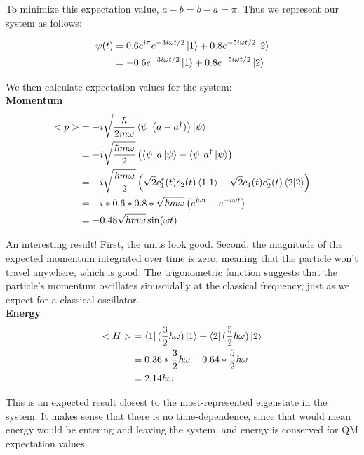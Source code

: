 \documentclass[10pt]{article} %
\begin{document}
To minimize this expectation value, $a-b = b-a = \pi$. Thus we represent our system as follows:

\begin{align*}
  \psi(t) &= 0.6e^{i\pi}e^{-3i\omega t/2}\ket{1} + 0.8e^{-5i\omega t/2}\ket{2}\\
  &= -0.6e^{-3i\omega t/2}\ket{1} + 0.8e^{-5i\omega t/2}\ket{2}\\
\end{align*}

We then calculate expectation values for the system:\\

\textbf{Momentum}
\begin{align*}
  <p> &= -i\sqrt{\frac{\hbar}{2m\omega}}\bra{\psi}\left(a - a^\dagger)\right)\ket{\psi}\\
  &= -i\sqrt{\frac{\hbar m\omega}{2}}\left(\bra{\psi}a\ket{\psi}
  - \bra{\psi}a^\dagger\ket{\psi}\right)\\
  &= -i\sqrt{\frac{\hbar m\omega}{2}}\left(\sqrt{2}c_1^*(t)c_2(t)\bra{1}\ket{1}
  - \sqrt{2}c_1(t)c_2^*(t)\bra{2}\ket{2}\right)\\
  &= -i*0.6*0.8*\sqrt{\hbar m\omega}\left(e^{i\omega t} - e^{-i\omega t}\right)\\
  &= -0.48\sqrt{\hbar m\omega}\sin(\omega t)\\
\end{align*}

An interesting result! First, the units look good. Second, the magnitude of the expected momentum
integrated over time is zero, meaning that the particle won't travel anywhere, which is good. The
trigonometric function suggests that the particle's momentum oscillates sinusoidally at the
classical frequency, just as we expect for a classical oscillator.\\

\textbf{Energy}
\begin{align*}
  <H> &= \bra{1}(\frac{3}{2}\hbar\omega)\ket{1} + \bra{2}(\frac{5}{2}\hbar\omega)\ket{2}\\
  &= 0.36 * \frac{3}{2}\hbar\omega + 0.64 * \frac{5}{2}\hbar\omega\\
  &= 2.14\hbar\omega\\
\end{align*}

This is an expected result closest to the most-represented eigenstate in the system. It makes sense
that there is no time-dependence, since that would mean energy would be entering and leaving the
system, and energy is conserved for QM expectation values.
\end{document}
